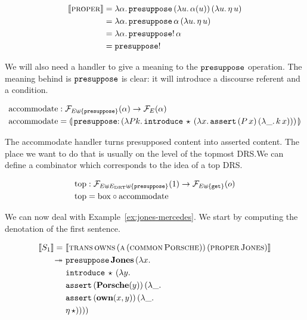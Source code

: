 \begin{align*}
  \llbracket \textsc{proper} \rrbracket
  &= \lambda \alpha.\, \mathtt{presuppose}\,(\lambda u.\, \alpha(u))\,(\lambda u.\, \eta\,u) \\
  &= \lambda \alpha.\, \mathtt{presuppose}\,\alpha\,(\lambda u.\, \eta\,u) \\
  &= \lambda \alpha.\, \mathtt{presuppose}!\,\alpha \\
  &= \mathtt{presuppose}!
\end{align*}

We will also need a handler to give a meaning to the $\mathtt{presuppose}$
operation. The meaning behind is $\mathtt{presuppose}$ is clear: it will
introduce a discourse referent and a condition.

\begin{align*}
  \accommodate &: \FF_{E \uplus \{\op{presuppose}\}}(\alpha) \to \FF_E(\alpha) \\
  \accommodate &= \banana{\onto{\op{presuppose}}{(\lam{P k}{\app{\op{introduce}}{\star}{(\lam{x}{\app{\op{assert}}{(\ap{P}{x})}{(\lam{\_}{\ap{k}{x}})}})}})}}
\end{align*}

The accommodate handler turns presupposed content into asserted
content. The place we want to do that is usually on the level of the
topmost DRS.\@ We can define a combinator which corresponds to the idea of
a top DRS.

\begin{align*}
  \mathrm{top} &: \mathcal{F}_{E \uplus E_{\mathrm{DRT}} \uplus \{\mathtt{presuppose}\}}(1) \to \mathcal{F}_{E \uplus \{\mathtt{get}\}}(o) \\
  \mathrm{top} &= \mathrm{box} \circ \operatorname{accommodate}
\end{align*}

We can now deal with Example~\ref{ex:jones-mercedes}. We start by computing
the denotation of the first sentence.

\begin{align*}
  \sem{S_1} =
     &\ \sem{\appp{\abs{trans}}{\abs{owns}}{(\ap{\abs{a}}{(\ap{\abs{common}}{\abs{Porsche}})})}{(\ap{\abs{proper}}{\abs{Jones}})}} \\
\tto &\ \app{\op{presuppose}}{\obj{Jones}}{(\lam{x}{ \\
     &\ \app{\op{introduce}}{\star}{(\lam{y}{ \\
     &\ \app{\op{assert}}{(\obj{Porsche}(y))}{(\lam{\_}{ \\
     &\ \app{\op{assert}}{(\obj{own}(x, y))}{(\lam{\_}{ \\
     &\ \etaE{\star}})}})}})}})}
\end{align*}

